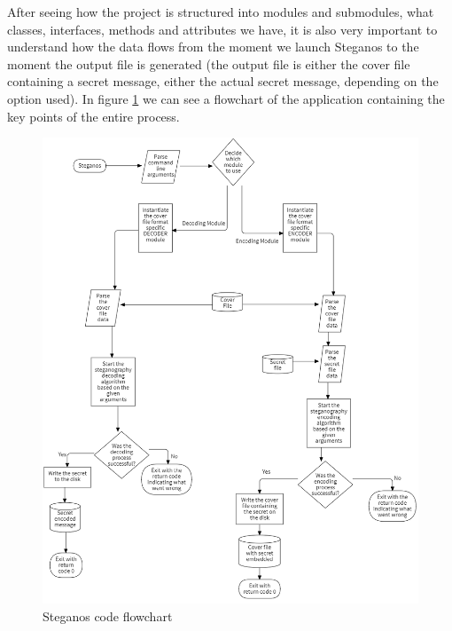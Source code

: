 \begin{multicols}{2}
After seeing how the project is structured into modules and submodules, what classes, interfaces, methods and attributes we have, it is also very important to understand how the data flows from the moment we launch Steganos to the moment the output file is generated (the output file is either the cover file containing a secret message, either the actual secret message, depending on the option used). In figure \ref{flowchart-code} we can see a flowchart of the application containing the key points of the entire process.
\end{multicols}
\begin{figure}[H]
    \centering
    \includegraphics[width=15cm,keepaspectratio]{pics/application_chapter/flowchart}
    \caption{Steganos code flowchart}
    \label{flowchart-code}
\end{figure}


